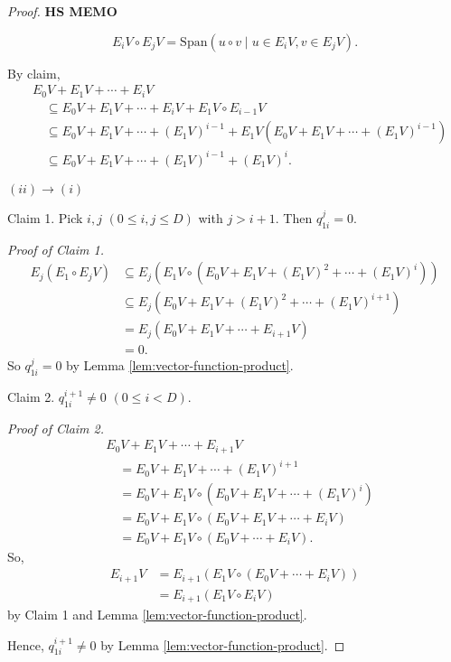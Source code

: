 \documentclass[
]{book}
\theoremstyle{definition}
\theoremstyle{definition}
\theoremstyle{definition}
\theoremstyle{definition}
\theoremstyle{remark}
\begin{document}
\begin{proof}
\textbf{HS MEMO}

\[E_iV \circ E_jV = \mathrm{Span}(u\circ v \mid u\in E_iV, v\in E_jV).\]

By claim,
\begin{align}
& E_0V + E_1V + \cdots + E_iV\\
& \quad \subseteq E_0V + E_1V + \cdots + E_iV + E_1V\circ E_{i-1}V\\
& \quad \subseteq E_0V + E_1V + \cdots + (E_{1}V)^{i-1} + E_1V(E_0V + E_1V + \cdots + (E_{1}V)^{i-1})\\
& \quad \subseteq E_0V  + E_1V + \cdots + (E_{1}V)^{i-1} + (E_1V)^{i}.
\end{align}

\((ii)\to(i)\)

Claim 1. Pick \(i, j\) \((0\leq i,j\leq D)\) with \(j>i+1\). Then \(q^j_{1i} = 0\).

\emph{Proof of Claim 1.}
\begin{align}
E_j(E_1\circ E_jV) & \subseteq E_j(E_1V\circ(E_0V + E_1V + (E_1V)^2 + \cdots + (E_1V)^i))\\
& \subseteq E_j(E_0V + E_1V + (E_1V)^2 + \cdots + (E_1V)^{i+1})\\
& = E_j(E_0V + E_1V + \cdots + E_{i+1}V)\\
& = 0.
\end{align}
So \(q^j_{1i}=0\) by Lemma \ref{lem:vector-function-product}.

Claim 2. \(q^{i+1}_{1i} \neq 0\) \((0\leq i < D)\).

\emph{Proof of Claim 2.}
\begin{align}
& E_0V + E_1V + \cdots + E_{i+1}V\\
& \quad = E_0V + E_1V + \cdots + (E_1V)^{i+1}\\
& \quad = E_0V + E_1V\circ(E_0V + E_1V + \cdots + (E_{1}V)^{i})\\
& \quad = E_0V + E_1V\circ(E_0V + E_1V + \cdots + E_iV)\\
& \quad = E_0V  + E_1V\circ(E_0V + \cdots + E_iV).
\end{align}
So,
\begin{align}
E_{i+1}V & = E_{i+1}(E_1V\circ (E_0V + \cdots + E_iV))\\
& = E_{i+1}(E_1V \circ E_iV)
\end{align}
by Claim 1 and Lemma \ref{lem:vector-function-product}.

Hence, \(q^{i+1}_{1i}\neq 0\) by Lemma \ref{lem:vector-function-product}.

\end{proof}
\end{document}
